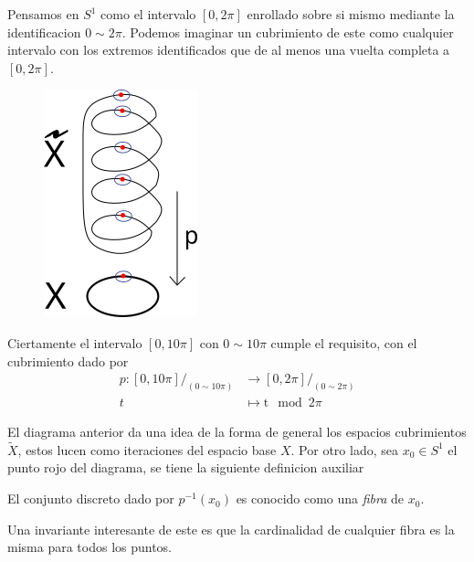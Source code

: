 \begin{ejemplo} \label{ej:10pi}
  Pensamos en \(S^1\) como el intervalo \([0, 2 \pi]\) enrollado sobre
  si mismo mediante la identificacion \(0 \sim 2 \pi\). Podemos imaginar
  un cubrimiento de este como cualquier intervalo con los extremos
  identificados que de al menos una vuelta completa a \([0, 2 \pi]\).
  \begin{figure}[h]
    \centering \includegraphics[scale=0.5]{./imagenes/spring.png}
  \end{figure}
  Ciertamente el intervalo \([0, 10 \pi]\) con \(0 \sim 10 \pi\) cumple
  el requisito, con el cubrimiento dado por
  \begin{align*}
    p : [0, 10 \pi] / _{(0 \sim 10\pi )} &\longrightarrow [0, 2 \pi] / _{(0 \sim 2\pi )} \\
    t &\longmapsto \mathrm t \mod 2 \pi
  \end{align*}
\end{ejemplo}
El diagrama anterior da una idea de la forma de general los espacios
cubrimientos \(\tilde X\), estos lucen como iteraciones del espacio base
\(X\). Por otro lado, sea \(x_0 \in S^1\) el punto rojo del diagrama, se
tiene la siguiente definicion auxiliar
\begin{definicion}[Fibra]
El conjunto discreto dado por \(p^{-1} (x_0)\) es conocido como una
\emph{fibra} de \(x_0\).
\end{definicion}
\noindent Una invariante interesante de este es que la cardinalidad de
cualquier fibra es la misma para todos los puntos.


